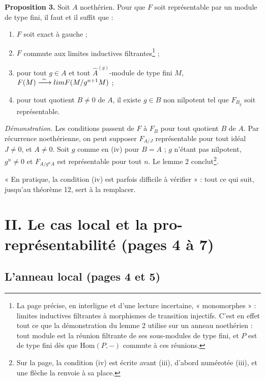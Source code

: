 \documentclass[11pt,a4paper]{article}
\begin{document}
\textbf{Proposition 3.} Soit $A$ noethérien. Pour que $F$ soit représentable
par un module de type fini, il faut et il suffit que :
\begin{enumerate}
\item[(i)] $F$ soit exact à gauche ;
\item[(ii)] $F$ commute aux limites inductives filtrantes\footnote{La page
précise, en interligne et d'une lecture incertaine, « monomorphes » : limites
inductives filtrantes à morphismes de transition injectifs. C'est en effet
tout ce que la démonstration du lemme 2 utilise sur un anneau noethérien :
tout module est la réunion filtrante de ses sous-modules de type fini, et
$P$ est de type fini dès que $\mathrm{Hom}(P,-)$ commute à ces réunions.} ;
\item[(iii)] pour tout $g \in A$ et tout $\widehat{A}^{(g)}$-module de type fini
$M$, $F(M) \xrightarrow{\ \sim\ } \varprojlim F(M/g^{n+1}M)$ ;
\item[(iv)] pour tout quotient $B \neq 0$ de $A$, il existe $g \in B$ non
nilpotent tel que $F_{B_g}$ soit représentable.
\end{enumerate}

\emph{Démonstration.} Les conditions passent de $F$ à $F_B$ pour tout quotient
$B$ de $A$. Par récurrence noethérienne, on peut supposer $F_{A/J}$
représentable pour tout idéal $J \neq 0$, et $A \neq 0$. Soit $g$ comme en
(iv) pour $B = A$ ; $g$ n'étant pas nilpotent, $g^{n} \neq 0$ et $F_{A/g^{n}A}$
est représentable pour tout $n$. Le lemme 2 conclut\footnote{Sur la page, la
condition (iv) est écrite avant (iii), d'abord numérotée (iii), et une flèche
la renvoie à sa place.}.

« En pratique, la condition (iv) est parfois difficile à vérifier » : tout ce
qui suit, jusqu'au théorème 12, sert à la remplacer.

\section*{II. Le cas local et la pro-représentabilité (pages 4 à 7)}

\subsection*{L'anneau local (pages 4 et 5)}
\end{document}
